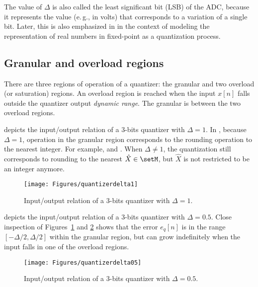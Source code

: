 The value of $\Delta$ is also called the least significant bit (LSB) of the ADC, because it represents the value (e.\,g., in volts) that corresponds to a variation of a single bit. Later, this is also emphasized in  in the context of modeling the representation of real numbers in fixed-point as a quantization process.

\subsection{Granular and overload regions}

There are three regions of operation of a quantizer: the granular  and two overload  (or saturation) regions. An overload region is reached when the input $x[n]$ falls outside the quantizer output \emph{dynamic range}. The granular is between the two overload regions. 

 depicts the input/output relation of a 3-bits quantizer with $\Delta=1$. 
In , because $\Delta=1$, operation in the granular region corresponds to the rounding operation  to the nearest integer. For example,  and . When $\Delta \ne 1$, the quantization still corresponds to rounding to the nearest $\hat X \in \setM$, but $\hat X$ is not restricted to be an integer anymore.

\begin{figure}
	\centering
		\texttt{[image: Figures/quantizerdelta1]}		
	\caption{Input/output relation of a 3-bits quantizer with $\Delta=1$.\label{fig:quantizerdelta1}}
\end{figure}

 depicts the input/output relation of a 3-bits quantizer with $\Delta=0.5$. Close inspection of Figures~\ref{fig:quantizerdelta1} and \ref{fig:quantizerdelta05} shows that the error $e_q[n]$ is in the range $[-\Delta/2, \Delta/2]$ within the granular region, but can grow indefinitely when the input falls in one of the overload regions.

\begin{figure}
	\centering
		\texttt{[image: Figures/quantizerdelta05]}		
	\caption{Input/output relation of a 3-bits quantizer with $\Delta=0.5$.\label{fig:quantizerdelta05}}
\end{figure}

